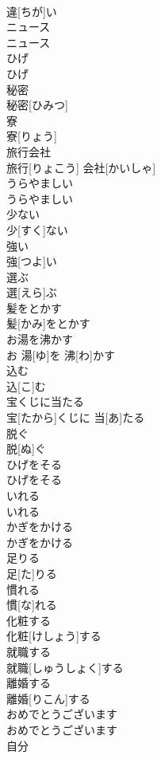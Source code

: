 \documentclass[8pt]{extreport}
\begin{document}
\begin{CJK}{UTF8}{min}
\\	違[ちが]い
\\	ニュース	
\\	ニュース
\\	ひげ	
\\	ひげ
\\	秘密	
\\	秘密[ひみつ]
\\	寮	
\\	寮[りょう]
\\	旅行会社	
\\	旅行[りょこう] 会社[かいしゃ]
\\	うらやましい	
\\	うらやましい
\\	少ない	
\\	少[すく]ない
\\	強い	
\\	強[つよ]い
\\	選ぶ	
\\	選[えら]ぶ
\\	髪をとかす	
\\	髪[かみ]をとかす
\\	お湯を沸かす	
\\	お 湯[ゆ]を 沸[わ]かす
\\	込む	
\\	込[こ]む
\\	宝くじに当たる	
\\	宝[たから]くじに 当[あ]たる
\\	脱ぐ	
\\	脱[ぬ]ぐ
\\	ひげをそる	
\\	ひげをそる
\\	いれる	
\\	いれる
\\	かぎをかける	
\\	かぎをかける
\\	足りる	
\\	足[た]りる
\\	慣れる	
\\	慣[な]れる
\\	化粧する	
\\	化粧[けしょう]する
\\	就職する	
\\	就職[しゅうしょく]する
\\	離婚する	
\\	離婚[りこん]する
\\	おめでとうございます	
\\	おめでとうございます
\\	自分	

\end{CJK}
\end{document}
